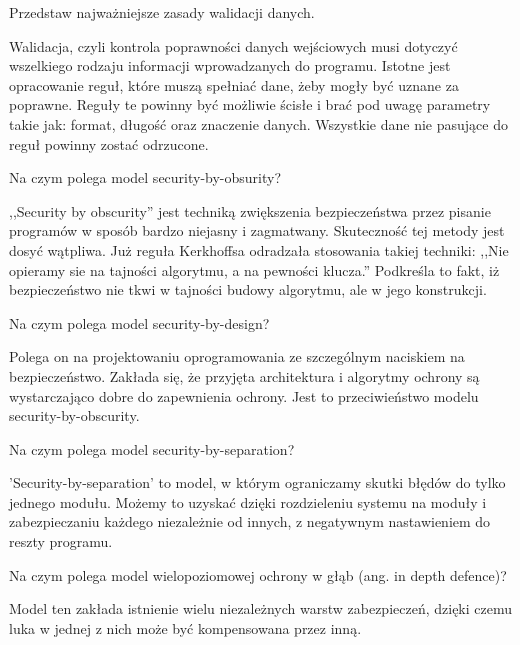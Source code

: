 \documentclass[answers,11pt]{exam}
\begin{document}
\begin{questions}
\question Przedstaw najważniejsze zasady walidacji danych.
\begin{solution}
Walidacja, czyli kontrola poprawności danych wejściowych musi dotyczyć wszelkiego rodzaju informacji wprowadzanych do programu. Istotne jest opracowanie reguł, które muszą spełniać dane, żeby mogły być uznane za poprawne. Reguły te powinny być możliwie ścisłe i brać pod uwagę parametry takie jak: format, długość oraz znaczenie danych. Wszystkie dane nie pasujące do reguł powinny zostać odrzucone.  
\end{solution}

\question Na czym polega model security-by-obsurity?
\begin{solution}
,,Security by obscurity'' jest techniką zwiększenia bezpieczeństwa przez pisanie programów w sposób bardzo niejasny i zagmatwany. Skuteczność tej metody jest dosyć wątpliwa.
Już reguła Kerkhoffsa odradzała stosowania takiej techniki: ,,Nie opieramy sie na tajności algorytmu, a na pewności klucza.'' Podkreśla to fakt, iż bezpieczeństwo nie tkwi w tajności budowy algorytmu, ale w jego konstrukcji.
\end{solution}

\question Na czym polega model security-by-design?
\begin{solution}
Polega on na projektowaniu oprogramowania ze szczególnym naciskiem na bezpieczeństwo. Zakłada się, że przyjęta architektura i algorytmy ochrony są wystarczająco dobre do zapewnienia ochrony. Jest to przeciwieństwo modelu security-by-obscurity.
\end{solution}

\question Na czym polega model security-by-separation?
\begin{solution}
'Security-by-separation' to model, w którym ograniczamy skutki błędów do tylko jednego modułu. Możemy to uzyskać dzięki rozdzieleniu systemu na moduły i zabezpieczaniu każdego  niezależnie od innych, z negatywnym nastawieniem do reszty programu.
\end{solution}

\question Na czym polega model wielopoziomowej ochrony w głąb (ang. in depth defence)?
\begin{solution}
Model ten zakłada istnienie wielu niezależnych warstw zabezpieczeń, dzięki czemu luka w jednej z nich może być kompensowana przez inną. 
\end{solution}
\end{questions}
\end{document}
